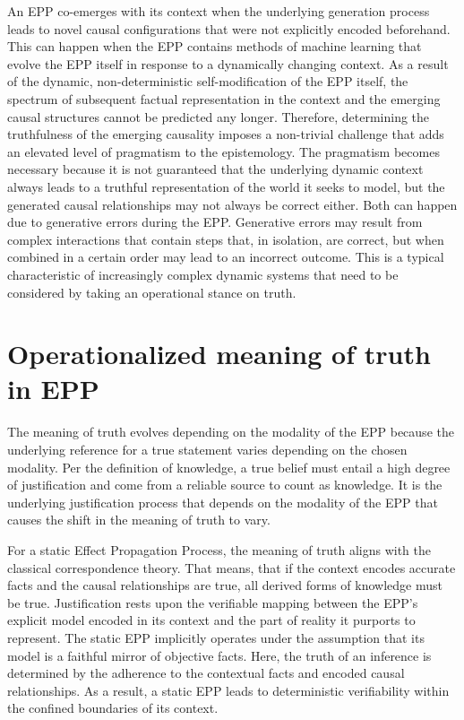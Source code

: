 \documentclass{article}
\begin{document}
An EPP co-emerges with its context when the underlying generation process leads to novel causal configurations that were not explicitly encoded beforehand. This can happen when the EPP contains methods of machine learning that evolve the EPP itself in response to a dynamically changing context. As a result of the dynamic, non-deterministic self-modification of the EPP itself, the spectrum of subsequent factual representation in the context and the emerging causal structures cannot be predicted any longer.
Therefore, determining the truthfulness of the emerging causality imposes a non-trivial challenge that adds an elevated level of pragmatism to the epistemology. The pragmatism becomes necessary because it is not guaranteed that the underlying dynamic context always leads to a truthful representation of the world it seeks to model, but the generated causal relationships may not always be correct either. Both can happen due to generative errors during the EPP. Generative errors may result from complex interactions that contain steps that, in isolation, are correct, but when combined in a certain order may lead to an incorrect outcome. This is a typical characteristic of increasingly complex dynamic systems that need to be considered by taking an operational stance on truth.

\section{Operationalized meaning of truth in EPP}
\label{sec:Operationalized_Truth}

The meaning of truth evolves depending on the modality of the EPP because the underlying reference for a true statement varies depending on the chosen modality. Per the definition of knowledge, a true belief must entail a high degree of justification and come from a reliable source to count as knowledge. It is the underlying justification process that depends on the modality of the EPP that causes the shift in the meaning of truth to vary.

For a static Effect Propagation Process, the meaning of truth aligns with the classical correspondence theory. That means, that if the context encodes accurate facts and the causal relationships are true, all derived forms of knowledge must be true.
Justification rests upon the verifiable mapping between the EPP's explicit model encoded in its context and the part of reality it purports to represent. The static EPP implicitly operates under the assumption that its model is a faithful mirror of objective facts. Here, the truth of an inference is determined by the adherence to the contextual facts and encoded causal relationships. As a result, a static EPP leads to deterministic verifiability within the confined boundaries of its context.
\end{document}

